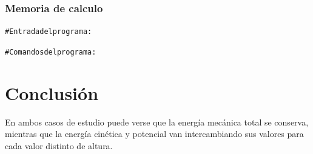 \documentclass[letter,11pt]{article}
\begin{document}
\subsubsection{Memoria de calculo}

\begin{shaded}
\begin{alltt}
\footnotesize
\# Entrada del programa:


\# Comandos del programa:


\normalsize
\end{alltt}
\end{shaded}

\section{Conclusión}
En ambos casos de estudio puede verse que la energía mecánica total se conserva,
mientras que la energía cinética y potencial van intercambiando sus valores para
cada valor distinto de altura.
\end{document}
